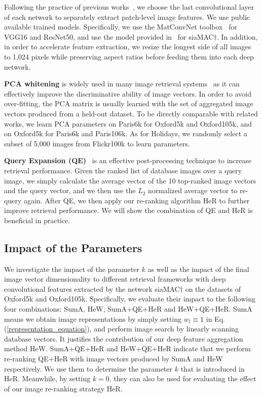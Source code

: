 \documentclass[journal]{IEEEtran}
\begin{document}
Following the practice of previous works~\cite{kalantidis2016cross,radenovic2016cnn},
we choose the last convolutional layer of each network to separately extract patch-level image features.
We use public available trained models. Specifically, we use the MatConvNet toolbox~\cite{vedaldi2015matconvnet} for VGG16 and ResNet50,
and use the model provided in~\cite{arandjelovic2016netvlad}  for siaMAC$\dagger$. In addition, in order to accelerate feature extraction,
we resize the longest side of all images to 1,024 pixels while preserving aspect ratios before feeding them  into each deep network.

\vspace{0.01in}
\textbf{PCA whitening} is widely used in many image retrieval systems~\cite{jegou2012negative,kalantidis2016cross,hoang2017selective,babenko2015aggregating} as it can effectively improve the discriminative ability of image vectors.
In order to avoid over-fitting,
the PCA matrix is usually learned with the set of aggregated image vectors produced from a held-out dataset.
To be directly comparable with related works, we learn PCA parameters on Paris6k for Oxford5k and Oxford105k,
and on Oxford5k for Paris6k and Paris106k.
As for Holidays, we randomly select a subset of 5,000 images from Flickr100k to learn parameters.

\vspace{0.01in}
\textbf{Query Expansion (QE)}~\cite{chum2007total} is an effective post-processing technique to increase retrieval performance.
Given the ranked list of database images over a query image, we simply calculate the average vector of the 10 top-ranked image vectors and the query vector, and we then use the $L_2$ normalized average vector to re-query again.
After QE, we then apply our re-ranking algorithm HeR to further improve retrieval performance.
We will show the combination of QE and HeR is beneficial in practice.

\subsection{Impact of the Parameters} 
We investigate the impact of the parameter $k$ as well as the impact of the final image vector dimensionality
to different retrieval frameworks with deep convolutional features extracted by the network siaMAC$\dagger$ on the datasets of Oxford5k and Oxford105k.
Specifically, we evaluate their impact to
the following four combinations: SumA, HeW, SumA+QE+HeR and HeW+QE+HeR.
SumA means we obtain image representations by simply setting $w_l \equiv 1$ in Eq.(\ref{representation_equation}), and perform image search by linearly scanning database vectors.
It justifies the contribution of our deep feature aggregation method HeW.
SumA+QE+HeR and HeW+QE+HeR indicate that we perform re-ranking QE+HeR with image vectors produced by SumA and HeW respectively.
We use them to determine the parameter $k$ that is introduced in HeR.
Meanwhile, by setting $k=0$, they can also be used for evaluating the effect of our image re-ranking strategy HeR.
\end{document}

